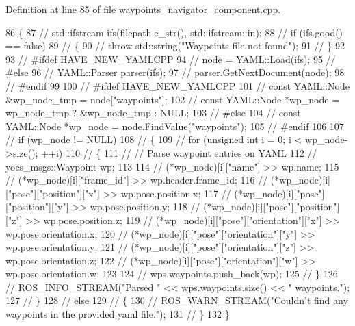 Definition at line 85 of file waypoints\+\_\+navigator\+\_\+component.\+cpp.


\begin{DoxyCode}
86 \{
87   \textcolor{comment}{//   std::ifstream ifs(filepath.c\_str(), std::ifstream::in);}
88   \textcolor{comment}{//   if (ifs.good() == false)}
89   \textcolor{comment}{//   \{}
90   \textcolor{comment}{//     throw std::string("Waypoints file not found");}
91   \textcolor{comment}{//   \}}
92 
93   \textcolor{comment}{// #ifdef HAVE\_NEW\_YAMLCPP}
94   \textcolor{comment}{//   node = YAML::Load(ifs);}
95   \textcolor{comment}{// #else}
96   \textcolor{comment}{//   YAML::Parser parser(ifs);}
97   \textcolor{comment}{//   parser.GetNextDocument(node);}
98   \textcolor{comment}{// #endif}
99 
100   \textcolor{comment}{// #ifdef HAVE\_NEW\_YAMLCPP}
101   \textcolor{comment}{//   const YAML::Node &wp\_node\_tmp = node["waypoints"];}
102   \textcolor{comment}{//   const YAML::Node *wp\_node = wp\_node\_tmp ? &wp\_node\_tmp : NULL;}
103   \textcolor{comment}{// #else}
104   \textcolor{comment}{//   const YAML::Node *wp\_node = node.FindValue("waypoints");}
105   \textcolor{comment}{// #endif}
106 
107   \textcolor{comment}{//   if (wp\_node != NULL)}
108   \textcolor{comment}{//   \{}
109   \textcolor{comment}{//     for (unsigned int i = 0; i < wp\_node->size(); ++i)}
110   \textcolor{comment}{//     \{}
111   \textcolor{comment}{//       // Parse waypoint entries on YAML}
112   \textcolor{comment}{//       yocs\_msgs::Waypoint wp;}
113 
114   \textcolor{comment}{//       (*wp\_node)[i]["name"] >> wp.name;}
115   \textcolor{comment}{//       (*wp\_node)[i]["frame\_id"] >> wp.header.frame\_id;}
116   \textcolor{comment}{//       (*wp\_node)[i]["pose"]["position"]["x"] >> wp.pose.position.x;}
117   \textcolor{comment}{//       (*wp\_node)[i]["pose"]["position"]["y"] >> wp.pose.position.y;}
118   \textcolor{comment}{//       (*wp\_node)[i]["pose"]["position"]["z"] >> wp.pose.position.z;}
119   \textcolor{comment}{//       (*wp\_node)[i]["pose"]["orientation"]["x"] >> wp.pose.orientation.x;}
120   \textcolor{comment}{//       (*wp\_node)[i]["pose"]["orientation"]["y"] >> wp.pose.orientation.y;}
121   \textcolor{comment}{//       (*wp\_node)[i]["pose"]["orientation"]["z"] >> wp.pose.orientation.z;}
122   \textcolor{comment}{//       (*wp\_node)[i]["pose"]["orientation"]["w"] >> wp.pose.orientation.w;}
123 
124   \textcolor{comment}{//       wps.waypoints.push\_back(wp);}
125   \textcolor{comment}{//     \}}
126   \textcolor{comment}{//     ROS\_INFO\_STREAM("Parsed " << wps.waypoints.size() << " waypoints.");}
127   \textcolor{comment}{//   \}}
128   \textcolor{comment}{//   else}
129   \textcolor{comment}{//   \{}
130   \textcolor{comment}{//     ROS\_WARN\_STREAM("Couldn't find any waypoints in the provided yaml file.");}
131   \textcolor{comment}{//   \}}
132 \}
\end{DoxyCode}
